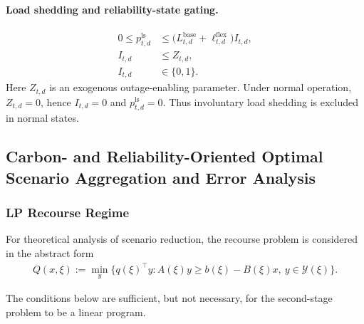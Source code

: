 \paragraph{Load shedding and reliability-state gating.}
\begin{align}
0 \le p^{\mathrm{ls}}_{t,d} &\le \big(L^{\mathrm{base}}_{t,d}+\ell^{\mathrm{flex}}_{t,d}\big) I_{t,d},
\label{eq:10a-load-shedding-gating}\\
I_{t,d} &\le Z_{t,d},
\label{eq:10a-reliability-link}\\
I_{t,d} &\in \{0,1\}.
\label{eq:10a-reliability-binary}
\end{align}
Here \(Z_{t,d}\) is an exogenous outage-enabling parameter. Under normal operation, \(Z_{t,d}=0\), hence \(I_{t,d}=0\) and \(p^{\mathrm{ls}}_{t,d}=0\). Thus involuntary load shedding is excluded in normal states.

\subsection{Carbon- and Reliability-Oriented Optimal Scenario Aggregation and Error Analysis}

\subsubsection{LP Recourse Regime}

For theoretical analysis of scenario reduction, the recourse problem is considered in the abstract form
\begin{align}
Q(x,\xi) := \min_{y} \{q(\xi)^\top y : A(\xi)y \ge b(\xi)-B(\xi)x,\ y\in\mathcal{Y}(\xi)\}.
\label{eq:10a-abstract-recourse}
\end{align}

The conditions below are sufficient, but not necessary, for the second-stage problem to be a linear program.

